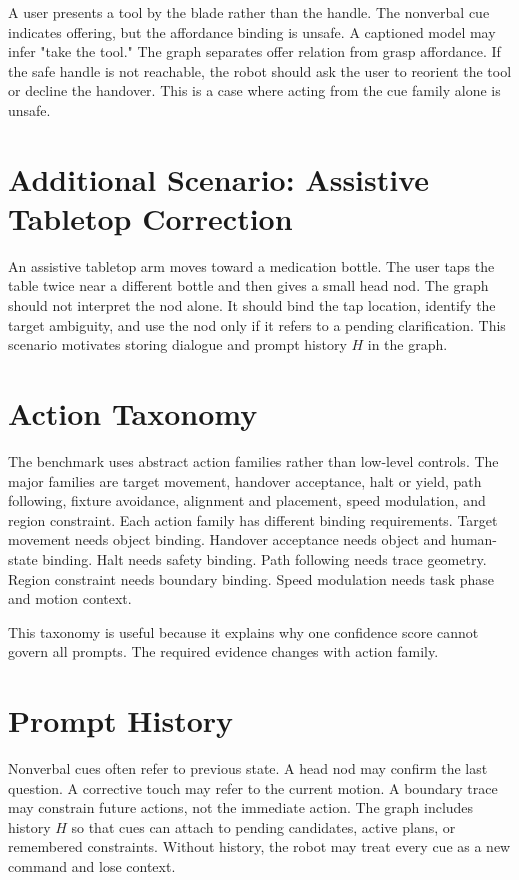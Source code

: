 \documentclass{article}
\begin{document}
A user presents a tool by the blade rather than the handle. The nonverbal cue indicates offering, but the affordance binding is unsafe. A captioned model may infer "take the tool." The graph separates offer relation from grasp affordance. If the safe handle is not reachable, the robot should ask the user to reorient the tool or decline the handover. This is a case where acting from the cue family alone is unsafe.

\section{Additional Scenario: Assistive Tabletop Correction}

An assistive tabletop arm moves toward a medication bottle. The user taps the table twice near a different bottle and then gives a small head nod. The graph should not interpret the nod alone. It should bind the tap location, identify the target ambiguity, and use the nod only if it refers to a pending clarification. This scenario motivates storing dialogue and prompt history $H$ in the graph.

\section{Action Taxonomy}

The benchmark uses abstract action families rather than low-level controls. The major families are target movement, handover acceptance, halt or yield, path following, fixture avoidance, alignment and placement, speed modulation, and region constraint. Each action family has different binding requirements. Target movement needs object binding. Handover acceptance needs object and human-state binding. Halt needs safety binding. Path following needs trace geometry. Region constraint needs boundary binding. Speed modulation needs task phase and motion context.

This taxonomy is useful because it explains why one confidence score cannot govern all prompts. The required evidence changes with action family.

\section{Prompt History}

Nonverbal cues often refer to previous state. A head nod may confirm the last question. A corrective touch may refer to the current motion. A boundary trace may constrain future actions, not the immediate action. The graph includes history $H$ so that cues can attach to pending candidates, active plans, or remembered constraints. Without history, the robot may treat every cue as a new command and lose context.
\end{document}
